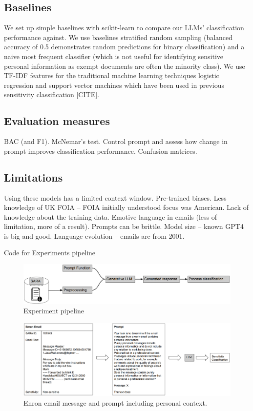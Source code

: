 \subsection{Baselines}
We set up simple baselines with scikit-learn to compare our LLMs’ classification performance against. We use baselines stratified random sampling (balanced accuracy of 0.5 demonstrates random predictions for binary classification) and a naive most frequent classifier (which is not useful for identifying sensitive personal information as exempt documents are often the minority class). We use TF-IDF features for the traditional machine learning techniques logistic regression and support vector machines which have been used in previous sensitivity classification [CITE].

\subsection{Evaluation measures}
BAC (and F1).
McNemar’s test. Control prompt and assess how change in prompt improves classification performance.
Confusion matrices.

\subsection{Limitations}
Using these models has a limited context window.
Pre-trained biases.
Less knowledge of UK FOIA – FOIA initially understood focus was American.
Lack of knowledge about the training data.
Emotive language in emails (less of limitation, more of a result).
Prompts can be brittle.
Model size – known GPT4 is big and good.
Language evolution – emails are from 2001.


Code for Experiments 
pipeline



\begin{figure}
\begin{center}
\includegraphics[scale=0.3]{figures/pipeline.pdf}
\end{center}
\caption{\label{fig-pipeline}Experiment pipeline}
\end{figure}


\begin{figure}
\begin{center}
\includegraphics[scale=0.3]{figures/inputprompt.pdf}
\end{center}
\caption{\label{fig-input}Enron email message and prompt including personal context.}
\end{figure}